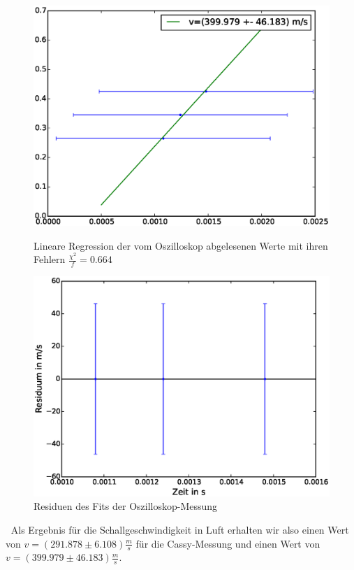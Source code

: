 \documentclass[12pt,a4paper]{article}
\begin{document}
\begin{figure}[H]
\centering
\includegraphics[scale=0.8]{Bilder/Linreg-Oszi.eps}
\caption{Lineare Regression der vom Oszilloskop abgelesenen Werte mit ihren Fehlern $\frac{\chi^2}{f}=0.664$}
\includegraphics[scale=0.8]{Bilder/Residuen-Oszi.eps}
\caption{Residuen des Fits der Oszilloskop-Messung}
\end{figure}
$~$\newline
Als Ergebnis für die Schallgeschwindigkeit in Luft erhalten wir also einen Wert von \newline $v=(291.878 \pm 6.108) \frac{m}{s}$ für die Cassy-Messung und einen Wert von\newline $v=(399.979 \pm 46.183)\frac{m}{s}$.
\end{document}
